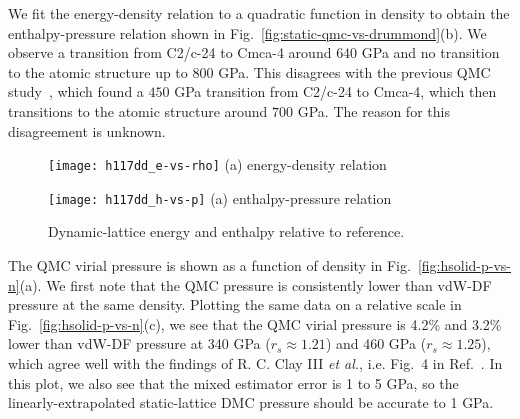 We fit the energy-density relation to a quadratic function in density to obtain the enthalpy-pressure relation shown in Fig.~\ref{fig:static-qmc-vs-drummond}(b). We observe a transition from C2/c-24 to Cmca-4 around $640$ GPa and no transition to the atomic structure up to $800$ GPa.
This disagrees with the previous QMC study~\cite{McMinis2015}, which found a $450$ GPa transition from C2/c-24 to Cmca-4, which then transitions to the atomic structure around $700$ GPa.
The reason for this disagreement is unknown.

\begin{figure}[h]
\begin{minipage}{0.49\textwidth}
\centering
\texttt{[image: h117dd\_e-vs-rho]}
(a) energy-density relation
\end{minipage}
\begin{minipage}{0.49\textwidth}
\centering
\texttt{[image: h117dd\_h-vs-p]}
(a) enthalpy-pressure relation
\end{minipage}
\caption{Dynamic-lattice energy and enthalpy relative to reference.}
\label{fig:dynamic-qmc-vs-drummond}
\end{figure}

The QMC virial pressure is shown as a function of density in Fig.~\ref{fig:hsolid-p-vs-n}(a).
We first note that the QMC pressure is consistently lower than vdW-DF pressure at the same density.
Plotting the same data on a relative scale in Fig.~\ref{fig:hsolid-p-vs-n}(c),
we see that the QMC virial pressure is 4.2\% and 3.2\% lower than vdW-DF pressure at 340 GPa ($r_s\approx 1.21$) and 460 GPa ($r_s\approx 1.25$), which agree well with the findings of R. C. Clay III \textit{et al.}, i.e. Fig.~4 in Ref.~\cite{Clay2016}.
In this plot, we also see that the mixed estimator error is 1 to 5 GPa, so the linearly-extrapolated static-lattice DMC pressure should be accurate to 1 GPa.

